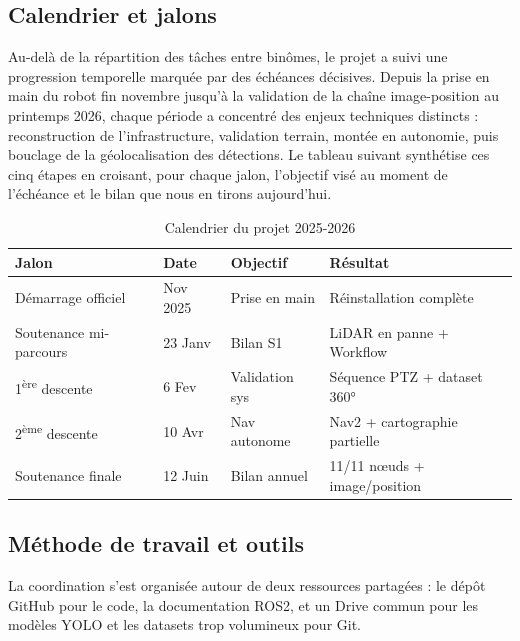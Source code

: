 \documentclass[12pt,a4paper]{article}
\begin{document}
\subsection{Calendrier et jalons}

Au-delà de la répartition des tâches entre binômes, le projet a suivi une progression temporelle marquée par des échéances décisives. Depuis la prise en main du robot fin novembre jusqu'à la validation de la chaîne image-position au printemps 2026, chaque période a concentré des enjeux techniques distincts : reconstruction de l'infrastructure, validation terrain, montée en autonomie, puis bouclage de la géolocalisation des détections. Le tableau suivant synthétise ces cinq étapes en croisant, pour chaque jalon, l'objectif visé au moment de l'échéance et le bilan que nous en tirons aujourd'hui.

\begin{table}[htbp]
    \centering
    \begin{tabular}{|l|l|l|l|}
        \hline
        \textbf{Jalon} & \textbf{Date} & \textbf{Objectif} & \textbf{Résultat} \\
        \hline
        Démarrage officiel & Nov 2025 & Prise en main & Réinstallation complète \\
        \hline
        Soutenance mi-parcours & 23 Janv & Bilan S1 & LiDAR en panne + Workflow \\
        \hline
        1\textsuperscript{ère} descente & 6 Fev & Validation sys & Séquence PTZ + dataset 360° \\
        \hline
        2\textsuperscript{ème} descente & 10 Avr & Nav autonome & Nav2 + cartographie partielle \\
        \hline
        Soutenance finale & 12 Juin & Bilan annuel & 11/11 nœuds + image/position \\
        \hline
    \end{tabular}
    \caption{Calendrier du projet 2025-2026}
    \label{tab:jalons}
\end{table}

\subsection{Méthode de travail et outils}

La coordination s'est organisée autour de deux ressources partagées : le dépôt GitHub pour le code, la documentation ROS2, et un Drive commun pour les modèles YOLO et les datasets trop volumineux pour Git.
\end{document}
